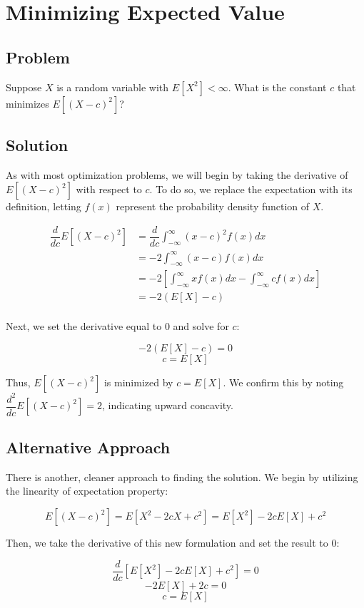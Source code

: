 \documentclass{article}
\date{}
\author{Kaan Aksoy | Feb 20, 2020}
\title{}
\begin{document}
\maketitle
\section{Minimizing Expected Value}
\subsection{Problem}

Suppose $X$ is a random variable with $E[X^2] < \infty$. What is 
the constant $c$ that minimizes $E[(X - c)^2]$?

\subsection{Solution}

As with most optimization problems, we will begin by taking the 
derivative of $E[(X - c)^2]$ with respect to $c$. To do so, we replace 
the expectation with its definition, letting $f(x)$ represent the 
probability density function of $X$.

\begin{equation*}
\begin{split}
\dfrac{d}{dc}E\left[(X - c)^2\right] &= 
\dfrac{d}{dc} \int_{-\infty}^{\infty} (x-c)^2f(x)dx \\
&= -2\int_{-\infty}^{\infty}(x-c)f(x)dx \\
&= -2\left[ \int_{-\infty}^{\infty}xf(x)dx - 
\int_{-\infty}^{\infty}cf(x)dx \right] \\
&= -2\left( E[X] - c \right) \\
\end{split}
\end{equation*}

Next, we set the derivative equal to $0$ and solve for $c$:

$$ -2\left( E[X] - c \right) = 0$$
$$ c = E[X]$$

Thus, $E[(X - c)^2]$ is minimized by $c = E[X]$. We confirm this by noting 
$\dfrac{d^2}{dc}E[(X - c)^2] = 2$, indicating upward concavity.

\subsection{Alternative Approach}
There is another, cleaner approach to finding the solution. We begin 
by utilizing the linearity of expectation property:

$$E[(X - c)^2] = E[X^2 - 2cX + c^2] = E[X^2] - 2cE[X] +c^2$$

Then, we take the derivative of this new formulation and set the result to $0$:

$$\dfrac{d}{dc} \left[ E[X^2] - 2cE[X] +c^2 \right] = 0$$
$$-2E[X] + 2c = 0$$
$$c = E[X]$$
\end{document}
